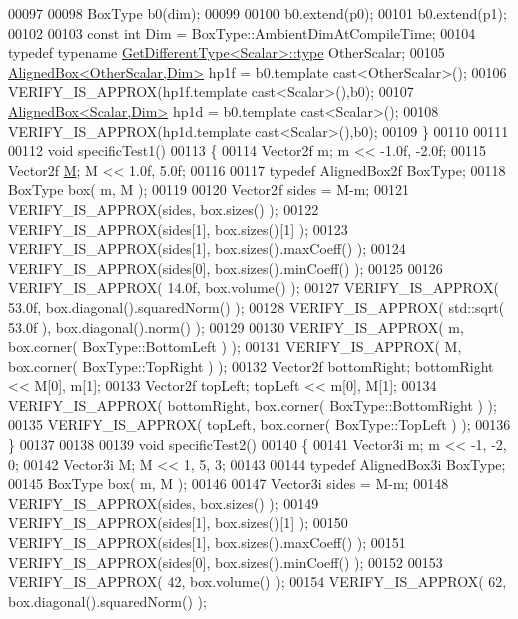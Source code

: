 \begin{DoxyCode}
00097 
00098   BoxType b0(dim);
00099 
00100   b0.extend(p0);
00101   b0.extend(p1);
00102 
00103   \textcolor{keyword}{const} \textcolor{keywordtype}{int} Dim = BoxType::AmbientDimAtCompileTime;
00104   \textcolor{keyword}{typedef} \textcolor{keyword}{typename} \hyperlink{struct_get_different_type}{GetDifferentType<Scalar>::type} OtherScalar;
00105   \hyperlink{group___geometry___module_class_eigen_1_1_aligned_box}{AlignedBox<OtherScalar,Dim>} hp1f = b0.template cast<OtherScalar>();
00106   VERIFY\_IS\_APPROX(hp1f.template cast<Scalar>(),b0);
00107   \hyperlink{group___geometry___module_class_eigen_1_1_aligned_box}{AlignedBox<Scalar,Dim>} hp1d = b0.template cast<Scalar>();
00108   VERIFY\_IS\_APPROX(hp1d.template cast<Scalar>(),b0);
00109 \}
00110 
00111 
00112 \textcolor{keywordtype}{void} specificTest1()
00113 \{
00114     Vector2f m; m << -1.0f, -2.0f;
00115     Vector2f \hyperlink{group___core___module_class_eigen_1_1_matrix}{M}; M <<  1.0f,  5.0f;
00116 
00117     \textcolor{keyword}{typedef} AlignedBox2f  BoxType;
00118     BoxType box( m, M );
00119 
00120     Vector2f sides = M-m;
00121     VERIFY\_IS\_APPROX(sides, box.sizes() );
00122     VERIFY\_IS\_APPROX(sides[1], box.sizes()[1] );
00123     VERIFY\_IS\_APPROX(sides[1], box.sizes().maxCoeff() );
00124     VERIFY\_IS\_APPROX(sides[0], box.sizes().minCoeff() );
00125 
00126     VERIFY\_IS\_APPROX( 14.0f, box.volume() );
00127     VERIFY\_IS\_APPROX( 53.0f, box.diagonal().squaredNorm() );
00128     VERIFY\_IS\_APPROX( std::sqrt( 53.0f ), box.diagonal().norm() );
00129 
00130     VERIFY\_IS\_APPROX( m, box.corner( BoxType::BottomLeft ) );
00131     VERIFY\_IS\_APPROX( M, box.corner( BoxType::TopRight ) );
00132     Vector2f bottomRight; bottomRight << M[0], m[1];
00133     Vector2f topLeft; topLeft << m[0], M[1];
00134     VERIFY\_IS\_APPROX( bottomRight, box.corner( BoxType::BottomRight ) );
00135     VERIFY\_IS\_APPROX( topLeft, box.corner( BoxType::TopLeft ) );
00136 \}
00137 
00138 
00139 \textcolor{keywordtype}{void} specificTest2()
00140 \{
00141     Vector3i m; m << -1, -2, 0;
00142     Vector3i M; M <<  1,  5, 3;
00143 
00144     \textcolor{keyword}{typedef} AlignedBox3i  BoxType;
00145     BoxType box( m, M );
00146 
00147     Vector3i sides = M-m;
00148     VERIFY\_IS\_APPROX(sides, box.sizes() );
00149     VERIFY\_IS\_APPROX(sides[1], box.sizes()[1] );
00150     VERIFY\_IS\_APPROX(sides[1], box.sizes().maxCoeff() );
00151     VERIFY\_IS\_APPROX(sides[0], box.sizes().minCoeff() );
00152 
00153     VERIFY\_IS\_APPROX( 42, box.volume() );
00154     VERIFY\_IS\_APPROX( 62, box.diagonal().squaredNorm() );

\end{DoxyCode}
